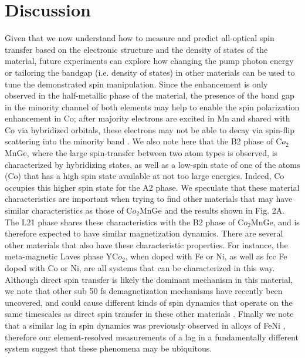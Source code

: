 \section{Discussion}
Given that we now understand how to measure and predict all-optical spin transfer based on the electronic structure and the density of states of the material, future experiments can explore how changing the pump photon energy or tailoring the bandgap (i.e. density of states)\cite{Klaer2009} in other materials can be used to tune the demonstrated spin manipulation. Since the enhancement is only observed in the half-metallic phase of the material, the presence of the band gap in the minority channel of both elements may help to enable the spin polarization enhancement in Co; after majority electrons are excited in Mn and shared with Co via hybridized orbitals, these electrons may not be able to decay via spin-flip scattering into the minority band \cite{Steil2010}. We also note here that the B2 phase of C$o_2$MnGe, where the large spin-transfer between two atom types is observed, is characterized by hybridizing states, as well as a low-spin state of one of the atoms (Co) that has a high spin state available at not too large energies. Indeed, Co occupies this higher spin state for the A2 phase. We speculate that these material characteristics are important when trying to find other materials that may have similar characteristics as those of C$o_2$MnGe and the results shown in Fig. 2A. The L21 phase shares these characteristics with the B2 phase of C$o_2$MnGe, and is therefore expected to have similar magnetization dynamics. There are several other materials that also have these characteristic properties. For instance, the meta-magnetic Laves phase YC$o_2$, when doped with Fe or Ni, as well as fcc Fe doped with Co or Ni, are all systems that can be characterized in this way. Although direct spin transfer is likely the dominant mechanism in this material, we note that other sub 50 fs demagnetization mechanisms have recently been uncovered, and could cause different kinds of spin dynamics that operate on the same timescales as direct spin transfer in these other materials \cite{Gort2018,Tengdin2018}. Finally we note that a similar lag in spin dynamics was previously observed in alloys of FeNi \cite{Mathias2012}, therefore our element-resolved measurements of a lag in a fundamentally different system suggest that these phenomena may be ubiquitous. 

